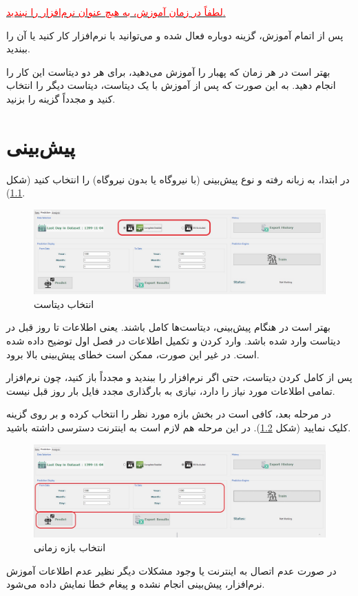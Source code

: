 \documentclass[a4paper,20pt,dvipsnames, usenames]{extbook}
\begin{document}
\underline{\textcolor{red}{لطفاً‌ در زمان آموزش، به هیچ عنوان نرم‌افزار را نبندید.}}

پس از اتمام آموزش، گزینه
دوباره فعال شده و می‌توانید با نرم‌افزار کار کنید یا آن را ببندید.

بهتر است در هر زمان که پهبار را آموزش می‌دهید، برای هر دو دیتاست این کار را انجام دهید. به این صورت که پس از آموزش با یک دیتاست، دیتاست دیگر را انتخاب کنید و مجدداً گزینه
را بزنید.
\chapter{پیش‌بینی}
در ابتدا، به زبانه 
رفته و نوع پیش‌بینی (با نیروگاه یا بدون نیروگاه) را انتخاب کنید (شکل
\ref{fig14}).
\begin{figure}[!h]
	\centering
	\includegraphics[width = \textwidth]{fig35}
	\caption{انتخاب دیتاست}
	\label{fig14}
\end{figure}
بهتر است در هنگام پیش‌بینی، دیتاست‌ها کامل باشند. یعنی اطلاعات تا روز قبل در دیتاست وارد شده باشد. وارد کردن و تکمیل اطلاعات در فصل اول توضیح داده شده است. در غیر این صورت، ممکن است خطای پیش‌بینی بالا برود.

پس از کامل کردن دیتاست، حتی اگر نرم‌افزار را ببندید و مجدداً باز کنید، چون نرم‌افزار تمامی اطلاعات مورد نیاز را دارد،‌ نیازی به بارگذاری مجدد فایل بار روز قبل نیست. 

در مرحله بعد، کافی است در بخش
بازه مورد نظر را انتخاب کرده و بر روی گزینه
کلیک نمایید (شکل
\ref{fig24}). در این مرحله هم لازم است به اینترنت دسترسی داشته باشید.
 \begin{figure}[!h]
	\centering
	\includegraphics[width = \textwidth]{fig11}
	\caption{انتخاب بازه زمانی}
	\label{fig24}
\end{figure}
در صورت عدم اتصال به اینترنت یا وجود مشکلات دیگر نظیر عدم اطلاعات آموزش نرم‌افزار، پیش‌بینی انجام نشده و پیغام خطا نمایش داده می‌شود.
\end{document}
